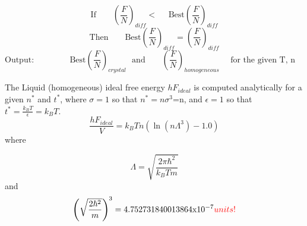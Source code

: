 \documentclass[12pt]{article}
\begin{document}
\begin{displaymath}\text{If~~~~~~}\left(\frac{F}{N}\right)_{diff}<\text{~~~~Best}\left(\frac{F}{N}\right)_{diff}\end{displaymath}
\begin{displaymath}\text{Then~~~~~~}\text{Best}\left(\frac{F}{N}\right)_{diff}=\left(\frac{F}{N}\right)_{diff}\end{displaymath}
\begin{displaymath}\text{Output:~~~~~~~~~~~~ Best}\left(\frac{F}{N}\right)_{crystal}\text{~~and~~~~~~}\left(\frac{F}{N}\right)_{homogeneous}\text{~~~~for the given T, n ~~~~~~~~~~~~~~~~~~~~~~~~~}\end{displaymath} 
\[\]

The Liquid (homogeneous) ideal free energy $hF_{ideal}$ is computed analytically for a given $n^*$ and $t^*$, where $\sigma=1$ so that $n^*=n\sigma^3$=n, and $\epsilon=1$ so that $t^*=\frac{k_BT}{\epsilon}=k_BT$. 
\begin{displaymath}{\frac{hF_{ideal}}{V}=k_BTn(\ln(n\Lambda^3)-1.0)}\end{displaymath} where 

\begin{displaymath}{\Lambda =\sqrt{\frac{2\pi\hbar^2}{k_BTm}}}\end{displaymath}  and
\begin{displaymath}\left(\sqrt{\frac{2\hbar^2}{m}}\right)^3=4.752731840013864\text{x}10^{-7}\color{red}units!\color{black}\end{displaymath} 
\end{document}
